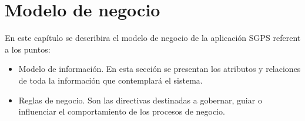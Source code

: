\chapter{Modelo de negocio}
\label{cap:reqSist}

En este capítulo se describira el modelo de negocio de la aplicación SGPS referent a los puntos:
\begin{itemize}
	\item Modelo de información. En esta sección se presentan los atributos y relaciones de toda la información que contemplará el sistema.
	\item Reglas de negocio. Son las directivas destinadas a gobernar, guiar o influenciar el comportamiento de los procesos de negocio.
\end{itemize}




